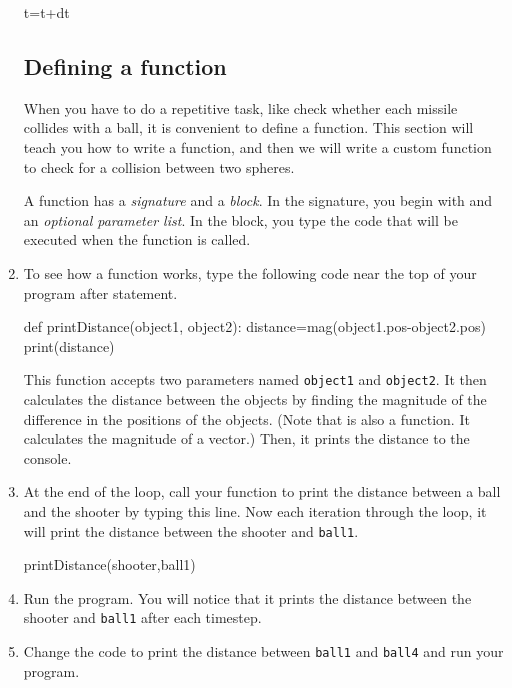 \begin{enumerate}
\begin{myvpython}
    t=t+dt
\end{myvpython}
		

\subsection*{Defining a function}

When you have to do a repetitive task, like check whether each missile collides with a ball, it is convenient to define a function. This section will teach you how to write a function, and then we will write a custom function to check for a collision between two spheres.

A function has a \emph{signature} and a \emph{block}.  In the signature, you begin with  and an \emph{optional parameter list}. In the block, you type the code that will be executed when the function is called.  

\item To see how a function works, type the following code near the top of your program after  statement.

\begin{myvpython}
def printDistance(object1, object2):
    distance=mag(object1.pos-object2.pos)
    print(distance)
\end{myvpython}

This function accepts two parameters named \texttt{object1} and \texttt{object2}.  It then calculates the distance between the objects by finding the magnitude of the difference in the positions of the objects. (Note that  is also a function. It calculates the magnitude of a vector.) Then, it prints the distance to the console.

\item At the end of the  loop, call your function to print the distance between a ball and the shooter by typing this line. Now each iteration through the loop, it will print the distance between the shooter and \texttt{ball1}.

\begin{myvpython}
    printDistance(shooter,ball1)
\end{myvpython}

\item Run the program. You will notice that it prints the distance between the shooter and \texttt{ball1}  after each timestep.

\item Change the code to print the distance between \texttt{ball1} and \texttt{ball4} and run your program. 


\end{enumerate}
